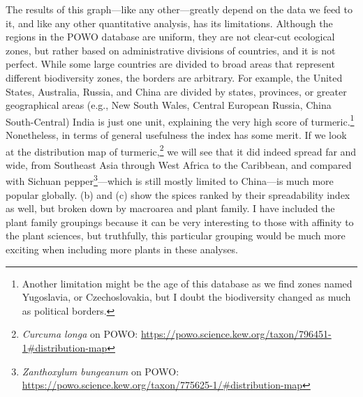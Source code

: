 The results of this graph---like any other---greatly depend on the data we feed to it, and like any other quantitative analysis, has its limitations. Although the regions in the \gls{POWO} database are uniform, they are not clear-cut ecological zones, but rather based on administrative divisions of countries, and it is not perfect. While some large countries are divided to broad areas that represent different biodiversity zones, the borders are arbitrary. For example, the United States, Australia, Russia, and China are divided by states, provinces, or greater geographical areas (e.g., New South Wales, Central European Russia, China South-Central) India is just one unit, explaining the very high score of turmeric.\footnote{Another limitation might be the age of this database as we find zones named Yugoslavia, or Czechoslovakia, but I doubt the biodiversity changed as much as political borders.} Nonetheless, in terms of general usefulness the index has some merit. If we look at the distribution map of turmeric,\footnote{\textit{Curcuma longa} on \gls{POWO}: \url{https://powo.science.kew.org/taxon/796451-1\#distribution-map}} we will see that it did indeed spread far and wide, from Southeast Asia through West Africa to the Caribbean, and compared with Sichuan pepper\footnote{\textit{Zanthoxylum bungeanum} on \gls{POWO}: \url{https://powo.science.kew.org/taxon/775625-1/\#distribution-map}}---which is still mostly limited to China---is much more popular globally.  (b) and (c) show the spices ranked by their spreadability index as well, but broken down by macroarea and plant family. I have included the plant family groupings because it can be very interesting to those with affinity to the plant sciences, but truthfully, this particular grouping would be much more exciting when including more plants in these analyses. 







